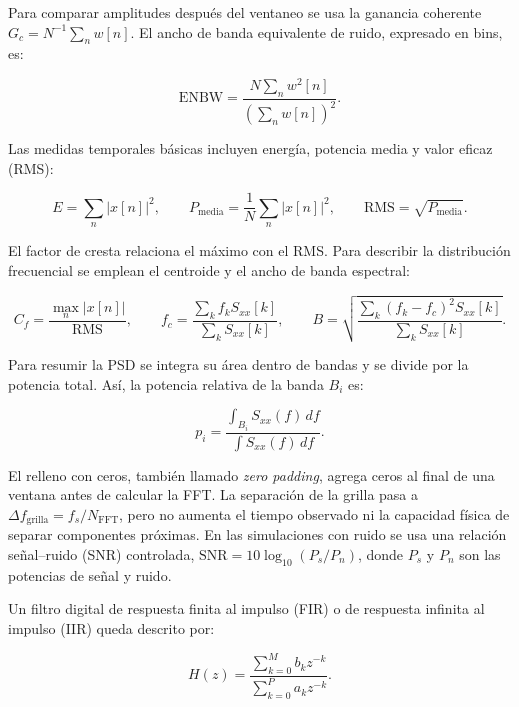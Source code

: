 \documentclass[11pt,a4paper]{article}
\begin{document}
Para comparar amplitudes después del ventaneo se usa la ganancia coherente
$G_c=N^{-1}\sum_n w[n]$. El ancho de banda equivalente de ruido, expresado en bins, es:

\begin{equation}
\mathrm{ENBW}=\frac{N\sum_n w^2[n]}{\left(\sum_n w[n]\right)^2}.
\end{equation}

Las medidas temporales básicas incluyen energía, potencia media y valor eficaz (RMS):

\begin{equation}
E=\sum_n |x[n]|^2,\qquad
P_{\mathrm{media}}=\frac{1}{N}\sum_n |x[n]|^2,\qquad
\mathrm{RMS}=\sqrt{P_{\mathrm{media}}}.
\end{equation}

El factor de cresta relaciona el máximo con el RMS. Para describir la distribución
frecuencial se emplean el centroide y el ancho de banda espectral:

\begin{equation}
C_f=\frac{\max_n|x[n]|}{\mathrm{RMS}},\qquad
f_c=\frac{\sum_k f_k S_{xx}[k]}{\sum_k S_{xx}[k]},\qquad
B=\sqrt{\frac{\sum_k(f_k-f_c)^2S_{xx}[k]}{\sum_kS_{xx}[k]}}.
\end{equation}

Para resumir la PSD se integra su área dentro de bandas y se divide por la potencia total.
Así, la potencia relativa de la banda $B_i$ es:

\begin{equation}
p_i=\frac{\int_{B_i} S_{xx}(f)\,df}{\int S_{xx}(f)\,df}.
\end{equation}

El relleno con ceros, también llamado \emph{zero padding}, agrega ceros al final de una
ventana antes de calcular la FFT. La separación de la grilla pasa a
$\Delta f_{\mathrm{grilla}}=f_s/N_{\mathrm{FFT}}$, pero no aumenta el tiempo observado ni
la capacidad física de separar componentes próximas. En las simulaciones con ruido se usa
una relación señal--ruido (SNR) controlada,
$\mathrm{SNR}=10\log_{10}(P_s/P_n)$, donde $P_s$ y $P_n$ son las potencias de señal y
ruido.

Un filtro digital de respuesta finita al impulso (FIR) o de respuesta infinita al impulso
(IIR) queda descrito por:

\begin{equation}
H(z)=\frac{\sum_{k=0}^{M}b_k z^{-k}}{\sum_{k=0}^{P}a_k z^{-k}}.
\end{equation}
\end{document}
